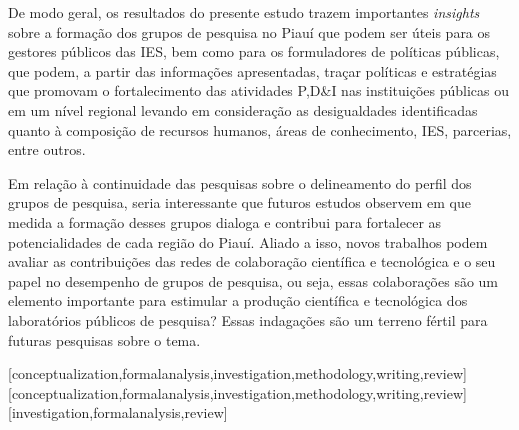 \documentclass[portuguese]{textolivre}
\begin{document}
De modo geral, os resultados do presente estudo trazem importantes \textit{insights} sobre a formação dos grupos de pesquisa no Piauí que podem ser úteis para os gestores públicos das IES, bem como para os formuladores de políticas públicas, que podem, a partir das informações apresentadas, traçar políticas e estratégias que promovam o fortalecimento das atividades P,D\&I nas instituições públicas ou em um nível regional levando em consideração as desigualdades identificadas quanto à composição de recursos humanos, áreas de conhecimento, IES, parcerias, entre outros.

Em relação à continuidade das pesquisas sobre o delineamento do perfil dos grupos de pesquisa, seria interessante que futuros estudos observem em que medida a formação desses grupos dialoga e contribui para fortalecer as potencialidades de cada região do Piauí. Aliado a isso, novos trabalhos podem avaliar as contribuições das redes de colaboração científica e tecnológica e o seu papel no desempenho de grupos de pesquisa, ou seja, essas colaborações são um elemento importante para estimular a produção científica e tecnológica dos laboratórios públicos de pesquisa? Essas indagações são um terreno fértil para futuras pesquisas sobre o tema.


\printbibliography\label{sec-bib}
\begin{contributors}
[conceptualization,formalanalysis,investigation,methodology,writing,review]
[conceptualization,formalanalysis,investigation,methodology,writing,review]
[investigation,formalanalysis,review]
\end{contributors}
\end{document}
